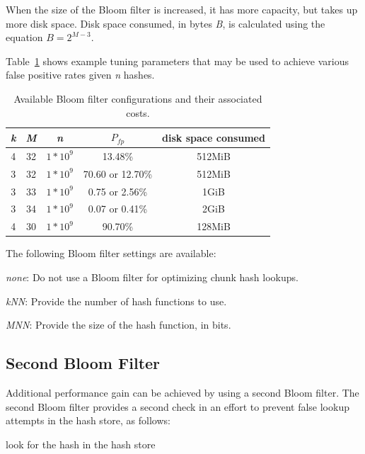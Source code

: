 \documentclass[10pt,twoside]{article}
\begin{document}
When the size of the Bloom filter is increased, it has more capacity,
but takes up more disk space.
Disk space consumed, in bytes \emph{B}, is calculated
using the equation \begin{math}B=2^{M-3}\end{math}.

Table~\ref{bloom-parameters} shows example tuning parameters
that may be used to achieve various false positive rates given \emph{n} hashes.

\begin{table}[h]
\center
\begin{tabular}{|c|c|c|c|c|}
\hline
\emph{k} & \emph{M} & \emph{n} & \begin{math}P_{fp}\end{math} & disk space consumed \\
\hline
4 & 32 & \begin{math}1*10^{9}\end{math} & 13.48\% & 512MiB \\
3 & 32 & \begin{math}1*10^{9}\end{math} & 70.60 or 12.70\% & 512MiB \\
3 & 33 & \begin{math}1*10^{9}\end{math} & 0.75 or 2.56\% & 1GiB \\
3 & 34 & \begin{math}1*10^{9}\end{math} & 0.07 or 0.41\% & 2GiB \\
4 & 30 & \begin{math}1*10^{9}\end{math} & 90.70\% & 128MiB \\
\hline
\end{tabular}
\caption{Available Bloom filter configurations and their associated costs.\label{bloom-parameters}}
\end{table}

The following Bloom filter settings are available:
\begin{compactitem}
\item \emph{none}: Do not use a Bloom filter for optimizing chunk hash lookups.
\item \emph{kNN}: Provide the number of hash functions to use.
\item \emph{MNN}: Provide the size of the hash function, in bits.
\end{compactitem}

\subsection{Second Bloom Filter}
Additional performance gain can be achieved by using a second Bloom filter.
The second Bloom filter provides a second check
in an effort to prevent false lookup attempts in the hash store, as follows:
\begin{algorithmic}
    \STATE look for the hash in the hash store
  \ENDIF
\ENDIF
\end{algorithmic}
\end{document}
